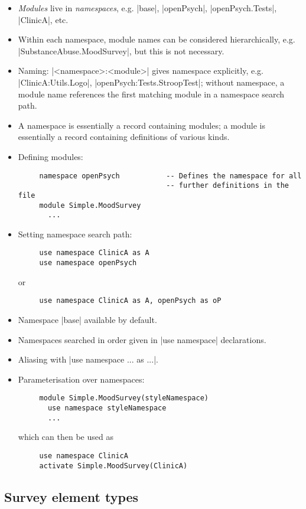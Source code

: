 \documentclass[DIV=calc,paper=a4,fontsize=11pt]{scrartcl}
\begin{document}
\begin{itemize}
  \item{\emph{Modules} live in \emph{namespaces}, e.g. |base|,
    |openPsych|, |openPsych.Tests|, |ClinicA|, etc.}
  \item{Within each namespace, module names can be considered
    hierarchically, e.g. |SubstanceAbuse.MoodSurvey|, but this is not
    necessary.}
  \item{Naming: |<namespace>:<module>| gives namespace explicitly,
    e.g. |ClinicA:Utils.Logo|, |openPsych:Tests.StroopTest|; without
    namespace, a module name references the first matching module in a
    namespace search path.}
  \item{A namespace is essentially a record containing modules; a module
   is essentially a record containing definitions of various kinds.}
  \item{Defining modules:
    \begin{Verbatim}
     namespace openPsych           -- Defines the namespace for all
                                   -- further definitions in the file
     module Simple.MoodSurvey
       ...
\end{Verbatim}
}
  \item{Setting namespace search path:
    \begin{Verbatim}
     use namespace ClinicA as A
     use namespace openPsych
\end{Verbatim}
   or
    \begin{Verbatim}
     use namespace ClinicA as A, openPsych as oP
\end{Verbatim}
}
  \item{Namespace |base| available by default.}
  \item{Namespaces searched in order given in |use namespace|
    declarations.}
  \item{Aliasing with |use namespace ... as ...|.}
  \item{Parameterisation over namespaces:
    \begin{Verbatim}
     module Simple.MoodSurvey(styleNamespace)
       use namespace styleNamespace
       ...
    \end{Verbatim}
   which can then be used as
    \begin{Verbatim}
     use namespace ClinicA
     activate Simple.MoodSurvey(ClinicA)
\end{Verbatim}
}
\end{itemize}


\subsection*{Survey element types}
\end{document}
